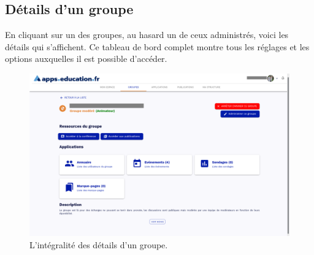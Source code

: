 \subsection{Détails d'un groupe}
En cliquant sur un des groupes, au hasard un de ceux administrés, voici les détails qui s'affichent. 
Ce tableau de bord complet montre tous les réglages et les options auxquelles il est possible d'accéder.
\begin{figure}
	\centering
	\includegraphics{./Captures/portail.groupe.affichage.details.png}
	\caption{L'intégralité des détails d'un groupe.}
\end{figure}
